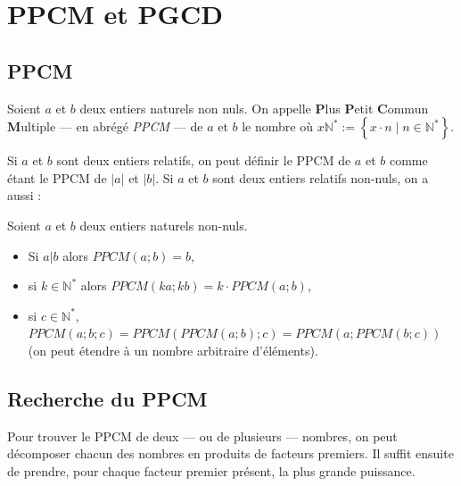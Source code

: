 \section{PPCM et PGCD}
      \subsection{PPCM}
      \begin{defi}
      Soient $a$ et $b$ deux entiers naturels non nuls.
      On appelle \textbf{P}lus \textbf{P}etit \textbf{C}ommun \textbf{M}ultiple 
      --- en abr\'eg\'e \emph{PPCM} --- de $a$ et $b$ le nombre 
            o\`u $x\mathbb{N}^* := \left\lbrace x \cdot n \mid n \in \mathbb{N}^* \right\rbrace$.
      
                 
      Si $a$ et $b$ sont deux entiers relatifs, 
      on peut d\'efinir le PPCM de $a$ et $b$ comme \'etant le PPCM de $|a|$ et $|b|$.
      Si $a$ et $b$ sont deux entiers relatifs non-nuls, on a aussi :
      \end{defi}
      \begin{prop}
            Soient $a$ et $b$ deux entiers naturels non-nuls.
            \begin{itemize}
                  \item Si $a|b$ alors $PPCM(a;b) = b$,
                  \item si $k\in\mathbb{N}^*$ alors $PPCM(ka;kb) = k \cdot PPCM(a;b)$,
                  \item si $c\in\mathbb{N}^*$, $PPCM(a;b;c) = PPCM(PPCM(a;b);c) = PPCM(a;PPCM(b;c))$
                        (on peut \'etendre \`a un nombre arbitraire d'\'el\'ements).
            \end{itemize}
      \end{prop}
      \subsection*{Recherche du PPCM}
            Pour trouver le PPCM de deux --- ou de plusieurs --- nombres, 
            on peut d\'ecomposer chacun des nombres en produits de facteurs premiers.
            Il suffit ensuite de prendre, pour chaque facteur premier pr\'esent, la plus grande puissance.
            
